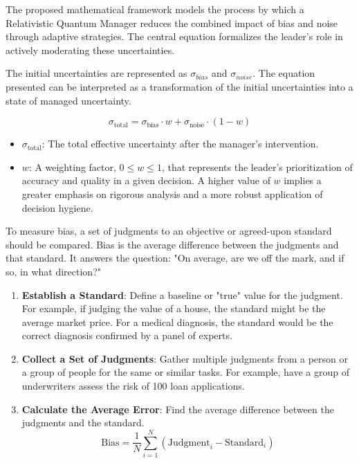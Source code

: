 \documentclass{article}
\begin{document}
The proposed mathematical framework models the process by which a Relativistic Quantum Manager reduces the combined impact of bias and noise through adaptive strategies. The central equation formalizes the leader's role in actively moderating these uncertainties.

The initial uncertainties are represented as $\sigma_{bias}$ and $\sigma_{noise}$. The equation presented can be interpreted as a transformation of the initial uncertainties into a state of managed uncertainty.

\begin{equation}
\sigma_{\text{total}} = \sigma_{\text{bias}} \cdot w + \sigma_{\text{noise}} \cdot (1-w)
\end{equation}

\begin{itemize}
    \item $\sigma_{\text{total}}$: The total effective uncertainty after the manager’s intervention.
    \item $w$: A weighting factor, $0 \le w \le 1$, that represents the leader's prioritization of accuracy and quality in a given decision. A higher value of $w$ implies a greater emphasis on rigorous analysis and a more robust application of decision hygiene.
\end{itemize}
To measure bias, a set of judgments to an objective or agreed-upon standard should be compared. Bias is the average difference between the judgments and that standard. It answers the question: "On average, are we off the mark, and if so, in what direction?"
 
 \begin{enumerate}
 	\item \textbf{Establish a Standard}: Define a baseline or "true" value for the judgment. For example, if judging the value of a house, the standard might be the average market price. For a medical diagnosis, the standard would be the correct diagnosis confirmed by a panel of experts.
 	\item \textbf{Collect a Set of Judgments}: Gather multiple judgments from a person or a group of people for the same or similar tasks. For example, have a group of underwriters assess the risk of 100 loan applications.
 	\item \textbf{Calculate the Average Error}: Find the average difference between the judgments and the standard.
 	$$ \text{Bias} = \frac{1}{N} \sum_{i=1}^{N} (\text{Judgment}_i - \text{Standard}_i) $$
 \end{enumerate}
\end{document}

